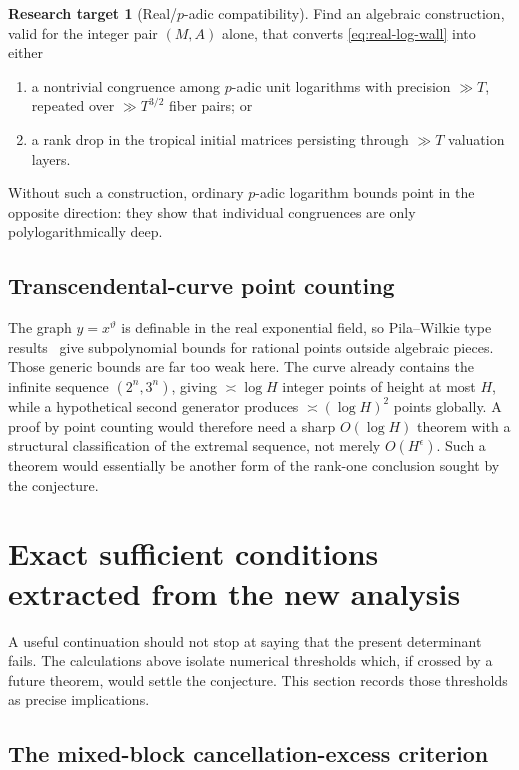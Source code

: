 \documentclass[11pt,oneside]{article}
\theoremstyle{definition}
\newtheorem{target}[theorem]{Research target}
\theoremstyle{remark}
\begin{document}
\begin{target}[Real/$p$-adic compatibility]\label{target:real-padic}
Find an algebraic construction, valid for the integer pair $(M,A)$ alone, that converts
\eqref{eq:real-log-wall} into either
\begin{enumerate}
\item a nontrivial congruence among $p$-adic unit logarithms with precision $\gg T$, repeated
      over $\gg T^{3/2}$ fiber pairs; or
\item a rank drop in the tropical initial matrices persisting through $\gg T$ valuation
      layers.
\end{enumerate}
Without such a construction, ordinary $p$-adic logarithm bounds point in the opposite
direction: they show that individual congruences are only polylogarithmically deep.
\end{target}

\subsection{Transcendental-curve point counting}

The graph $y=x^\vartheta$ is definable in the real exponential field, so Pila--Wilkie type
results~\cite{PilaWilkie2006} give subpolynomial bounds for rational points outside algebraic pieces.  Those generic
bounds are far too weak here.  The curve already contains the infinite sequence
$(2^n,3^n)$, giving $\asymp\log H$ integer points of height at most $H$, while a hypothetical
second generator produces $\asymp(\log H)^2$ points globally.  A proof by point counting would
therefore need a sharp $O(\log H)$ theorem with a structural classification of the extremal
sequence, not merely $O(H^\epsilon)$.  Such a theorem would essentially be another form of the
rank-one conclusion sought by the conjecture.

\section{Exact sufficient conditions extracted from the new analysis}
\label{sec:sufficient}

A useful continuation should not stop at saying that the present determinant fails.  The
calculations above isolate numerical thresholds which, if crossed by a future theorem, would
settle the conjecture.  This section records those thresholds as precise implications.

\subsection{The mixed-block cancellation-excess criterion}
\end{document}
